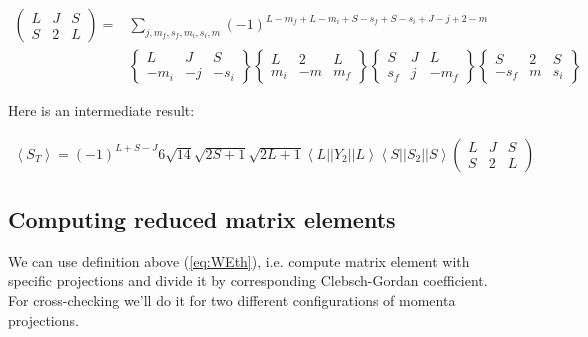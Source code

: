 \begin{align}
    \left(\begin{matrix}
        L & J & S \\
        S & 2 & L
       \end{matrix}\right) = &\sum_{j,m_f,s_f,m_i,s_i,m}
                                    (-1)^{L-m_f + L-m_i + S-s_f + S-s_i + J-j + 2-m} \\ \nonumber
                                    &\left\{\begin{matrix}
                                        L & J & S \\
                                        -m_i & -j & -s_i
                                    \end{matrix}\right\}
                                    \left\{\begin{matrix}
                                        L & 2 & L \\
                                        m_i & -m & m_f
                                    \end{matrix}\right\}
                                    \left\{\begin{matrix}
                                        S & J & L \\
                                        s_f & j & -m_f
                                    \end{matrix}\right\}
                                    \left\{\begin{matrix}
                                        S & 2 & S \\
                                        -s_f & m & s_i
                                    \end{matrix}\right\}
\end{align}

Here is an intermediate result:

\begin{align} \label{eq:STavMid}
    \left<S_T\right> = (-1)^{L+S-J} 6 \sqrt{14} \sqrt{2S+1} \sqrt{2L+1} \left<L||Y_2||L\right> \left<S||S_2||S\right> \left(\begin{matrix}
            L & J & S \\
            S & 2 & L
         \end{matrix}\right)
\end{align}

\subsection*{Computing reduced matrix elements}
We can use definition above (\cref{eq:WEth}), i.e. compute matrix element with
specific projections and divide it by corresponding Clebsch-Gordan coefficient.
For cross-checking we'll do it for two different configurations
of momenta projections.

